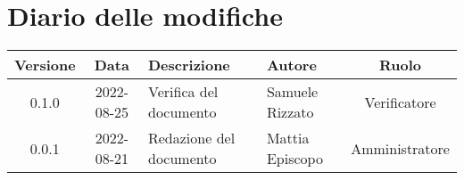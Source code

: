 \section*{Diario delle modifiche}
	\begin{center}
	\renewcommand{\arraystretch}{1.8} %
	\begin{tabular}{ |c|c|m{12em}|m{7em}|c| }
	\hline
	\textbf{Versione} & \textbf{Data} & \textbf{Descrizione} &  \textbf{Autore} &  \textbf{Ruolo} \\ %
	\hline
    0.1.0 & 2022-08-25 & Verifica del documento & Samuele \newline Rizzato & Verificatore\\ 
	\hline
    0.0.1 & 2022-08-21 & Redazione del documento & Mattia \newline Episcopo & Amministratore\\ 
	\hline
	\end{tabular}
	\end{center}
	\newpage